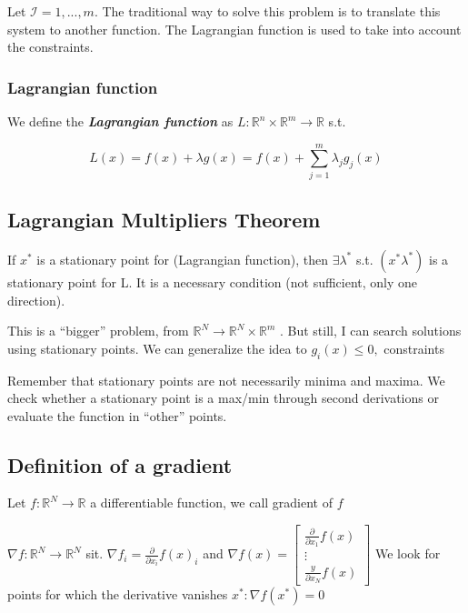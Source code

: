 Let $\mathcal{I}= 1,...,m$. The traditional way to solve this problem is
to translate this system to another function. The Lagrangian function is
used to take into account the constraints.

\hypertarget{lagrangian-function}{%
\subsubsection{Lagrangian function}\label{lagrangian-function}}

We define the \textbf{\emph{Lagrangian function}} as
$L: \mathbb{R}^n \times \mathbb{R}^m \rightarrow \mathbb{R}$ s.t.

$$
L(x)= f(x) + \lambda g(x) = f(x) + \sum_{j=1}^m \lambda_j g_j(x)
$$

\hypertarget{lagrangian-multipliers-theorem}{%
\subsection{Lagrangian Multipliers
Theorem}\label{lagrangian-multipliers-theorem}}

If $x^*$ is a stationary point for (Lagrangian function), then
$\exists \lambda^*$ s.t. $(x^* \lambda^*)$ is a stationary point for L. It
is a necessary condition (not sufficient, only one direction).

This is a ``bigger'' problem, from
$\mathbb{R}^N \rightarrow \mathbb{R}^N \times \mathbb{R}^m$ . But still,
I can search solutions using stationary points. We can generalize the
idea to $g_i(x) \leq 0,$ constraints

Remember that stationary points are not necessarily minima and maxima.
We check whether a stationary point is a max/min through second
derivations or evaluate the function in ``other'' points.

\hypertarget{definition-of-a-gradient}{%
\subsection{Definition of a
gradient}\label{definition-of-a-gradient}}

Let $f: \mathbb{R}^N \rightarrow \mathbb{R}$ a differentiable function,
we call gradient of $f$

$\nabla f: \mathbb{R}^N \rightarrow \mathbb{R}^N$ sit.
$\nabla f_i=\frac{\partial}{\partial x_i} f(x)_i$ and
$\nabla f(x) =\left[\begin{array}{c}\frac{\partial}{\partial x_1} f(x) \\ \vdots \\ \frac{y}{\partial x_N} f(x)\end{array}\right]$
We look for points for which the derivative vanishes
$x^* : \nabla f(x^*)=0$

